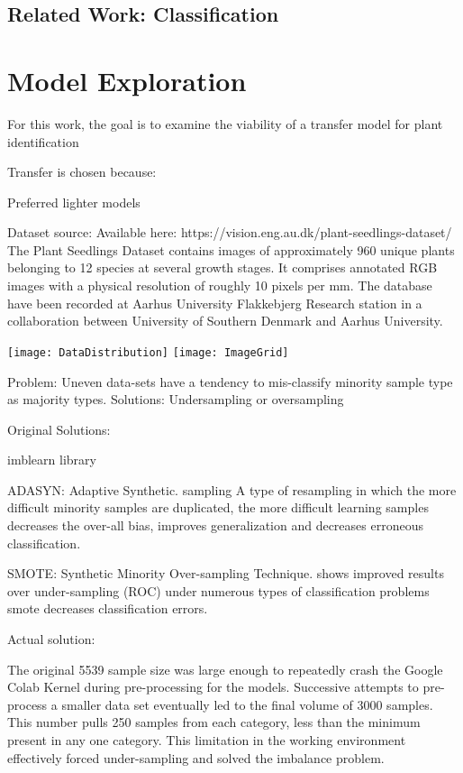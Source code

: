 \documentclass[]{article}
\begin{document}
\subsection{Related Work: Classification}

\section{Model Exploration}









For this work, the goal is to examine the viability of a transfer model for plant identification


Transfer is chosen because:

Preferred lighter models


Dataset source:
Available here: https://vision.eng.au.dk/plant-seedlings-dataset/
\cite{Giselsson2017}
The Plant Seedlings Dataset contains images of approximately 960 unique plants belonging to 12 species at several growth stages.
It comprises annotated RGB images with a physical resolution of roughly 10 pixels per mm.
The database have been recorded at Aarhus University Flakkebjerg Research station in a collaboration between University of Southern Denmark and Aarhus University.


\texttt{[image: DataDistribution]}
\texttt{[image: ImageGrid]}

Problem: Uneven data-sets have a tendency to mis-classify minority sample type as majority types.
Solutions: Undersampling or oversampling

Original Solutions:

imblearn library

ADASYN: Adaptive Synthetic. sampling
\cite{Bai2008} 
A type of resampling in which the more difficult minority samples are duplicated,
the more difficult learning samples decreases the over-all bias, improves generalization and decreases erroneous classification.

SMOTE: Synthetic Minority Over-sampling Technique.
\cite{Bowyer2011} shows improved results over under-sampling (ROC)
under numerous types of classification problems smote decreases classification errors.

Actual solution:

The original 5539 sample size was large enough to repeatedly crash the Google Colab Kernel during pre-processing for the models. Successive attempts to pre-process a smaller data set eventually led to the final volume of 3000 samples. This number pulls 250 samples from each category, less than the minimum present in any one category. This limitation in the working environment effectively forced under-sampling and solved the imbalance problem.
\end{document}

